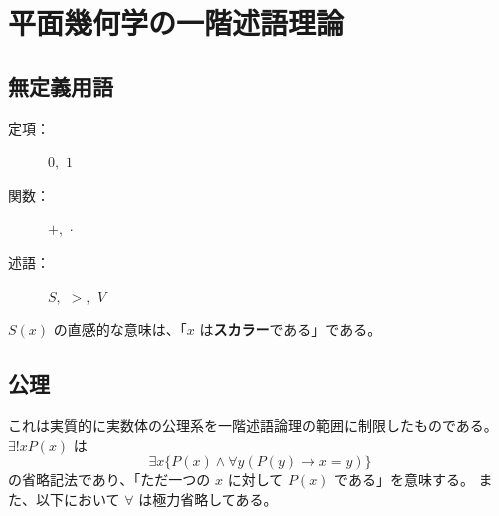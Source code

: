 \chapter{平面幾何学の一階述語理論}


\section{無定義用語}

\begin{description}
  \item[定項：] \(0,\) \(1\)
  \item[関数：] \(+,\) \(\cdot\)
  \item[述語：] \(S,\) \(>,\) \(V\)
\end{description}

\(S(x)\) の直感的な意味は、「\(x\) は\textbf{スカラー}である」である。


\section{公理}

これは実質的に実数体の公理系を一階述語論理の範囲に制限したものである。
\(\exists!xP(x)\) は
\[\exists x\{P(x)\land\forall y(P(y)\rightarrow x=y)\}\]
の省略記法であり、「ただ一つの \(x\) に対して \(P(x)\) である」を意味する。
また、以下において \(\forall\) は極力省略してある。

